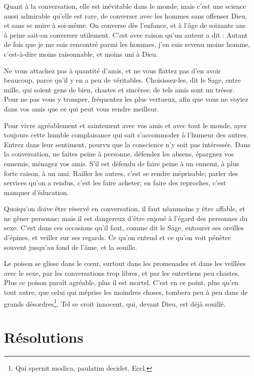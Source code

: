 \documentclass[instructions.tex]{subfiles}
\begin{document}
\secundo Quant à la conversation, elle est inévitable dans le monde; mais c'est une science aussi admirable qu'elle est rare, de converser avec les hommes sans offenser Dieu, et sans se nuire à soi-même. On converse dès l'enfance, et à l'âge de soixante ans à peine sait-on converser utilement. C'est avec raison qu'un auteur a dit : Autant de fois que je me suis rencontré parmi les hommes, j'en suis revenu moins homme, c'est-à-dire moins raisonnable, et moins uni à Dieu.
 
Ne vous attachez pas à quantité d'amis, et ne vous flattez pas d'en avoir beaucoup, parce qu'il y en a peu de véritables. Choisissez-les, dit le Sage, entre mille, qui soient gens de bien, chastes et sincères; de tels amis sont un trésor. Pour ne pas vous y tromper, fréquentez les plus vertueux, afin que vous ne voyiez dans vos amis que ce qui peut vous rendre meilleur.
 
Pour vivre agréablement et saintement avec vos amis et avec tout le monde, ayez toujours cette humble complaisance qui sait s'accommoder à l'humeur des autres. Entrez dans leur sentiment, pourvu que la conscience n'y soit pas intéressée. Dans la conversation, ne faites peine à personne, défendez les absens, épargnez vos ennemis, ménagez vos amis. S'il est défendu de faire peine à un ennemi, à plus forte raison, à un ami. Railler les autres, c'est se rendre méprisable; parler des services qu'on a rendus, c'est les faire acheter; en faire des reproches, c'est manquer d'éducation.
 
Quoiqu'on doive être réservé en conversation, il faut néanmoins y être affable, et ne gêner personne; mais il est dangereux d'être enjoué à l'égard des personnes du sexe. C'est dans ces occasions qu'il faut, comme dit le Sage, entourer ses oreilles d'épines, et veiller sur ses regards. Ce qu'on entend et ce qu'on voit pénètre souvent jusqu'au fond de l'âme, et la souille.
 
Le poison se glisse dans le cœur, surtout dans les promenades et dans les veillées avec le sexe, par les conversations trop libres, et par les entretiens peu chastes. Plus ce poison paraît agréable, plus il est mortel. C'est en ce point, plus qu'en tout autre, que celui qui méprise les moindres choses, tombera peu à peu dans de grands désordres\footnote{Qui spernit modica, paulatim decidet. Eccl.}. Tel se croit innocent, qui, devant Dieu, est déjà souillé.
 
\section{Résolutions}
 
\end{document}
